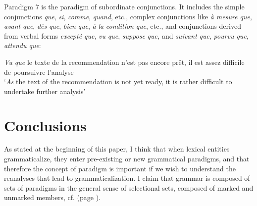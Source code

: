 \documentclass[output=paper]{langsci/langscibook}
\begin{document}
Paradigm 7 is the paradigm of subordinate conjunctions. It includes the simple conjunctions \textit{que}, \textit{si}, \textit{comme}, \textit{quand}, etc., complex conjunctions like \textit{à mesure que}, \textit{avant} \textit{que}, \textit{dès} \textit{que}, \textit{bien} \textit{que}, \textit{à} \textit{la} \textit{condition} \textit{que}, etc., and conjunctions derived from verbal forms \textit{excepté que}, \textit{vu} \textit{que}, \textit{suppose} \textit{que,} and \textit{suivant} \textit{que}, \textit{pourvu que}, \textit{attendu que}:

\begin{exe}
    \ex \label{ex:kragh:33} \emph{Vu que} le texte de la recommendation n’est pas encore prêt, il est assez difficile de poursuivre l’analyse\\
    `\emph{As} the text of the recommendation is not yet ready, it is rather difficult to undertake further analysis’
\end{exe}

\section{Conclusions} \label{kragh:5}

As stated at the beginning of this paper, I think that when lexical entities grammaticalize, they enter pre-existing or new grammatical paradigms, and that therefore the concept of paradigm is important if we wish to understand the reanalyses that lead to grammaticalization. I claim that grammar is composed of sets of paradigms in the general sense of selectional sets, composed of marked and unmarked members, cf.  (page \pageref{fig:kragh:8}).
\end{document}

